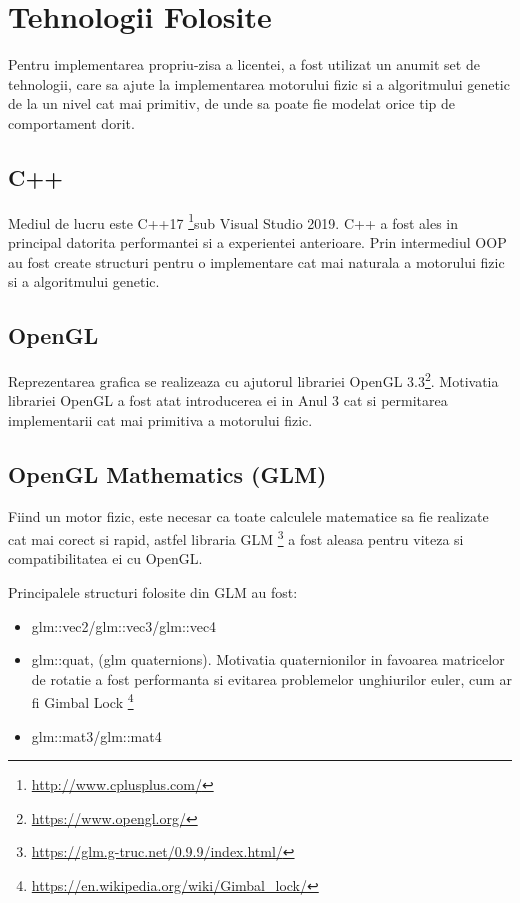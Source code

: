 \chapter{Tehnologii Folosite}

Pentru implementarea propriu-zisa a licentei, a fost utilizat un anumit set de tehnologii, care sa ajute la implementarea motorului fizic si a algoritmului genetic de la un nivel cat mai primitiv, de unde sa poate fie modelat orice tip de comportament dorit.

\section{C++}
 
Mediul de lucru este C++17 \footnote{\url{http://www.cplusplus.com/}}sub Visual Studio 2019. C++ a fost ales in principal datorita performantei si a experientei anterioare. Prin intermediul OOP au fost create structuri pentru o implementare cat mai naturala a motorului fizic si a algoritmului genetic. 

\section{OpenGL}
 
Reprezentarea grafica se realizeaza cu ajutorul librariei OpenGL 3.3\footnote{\url{https://www.opengl.org/}}. Motivatia librariei OpenGL a fost atat introducerea ei in Anul 3 cat si permitarea implementarii cat mai primitiva a motorului fizic.

\section{OpenGL Mathematics (GLM)}
 
Fiind un motor fizic, este necesar ca toate calculele matematice sa fie realizate cat mai corect si rapid, astfel libraria GLM \footnote{\url{https://glm.g-truc.net/0.9.9/index.html/}} a fost aleasa pentru viteza si compatibilitatea ei cu OpenGL.

Principalele structuri folosite din GLM au fost:
\begin{itemize}
    \item glm::vec2/glm::vec3/glm::vec4
    \item glm::quat, (glm quaternions). Motivatia quaternionilor in favoarea matricelor de rotatie a fost performanta si evitarea problemelor unghiurilor euler, cum ar fi Gimbal Lock \footnote{\url{https://en.wikipedia.org/wiki/Gimbal_lock/}}
    \item glm::mat3/glm::mat4
\end{itemize}

